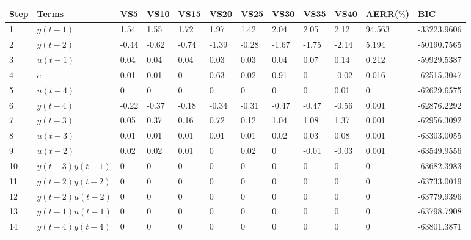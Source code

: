 \begin{tabular}{llllllllllll}
Step & Terms & VS5 & VS10 & VS15 & VS20 & VS25 & VS30 & VS35 & VS40 & AERR($\%$) & BIC \\ 
\hline 
1 & $y(t-1)$ & 1.54 & 1.55 & 1.72 & 1.97 & 1.42 & 2.04 & 2.05 & 2.12 & 94.563 & -33223.9606 \\ 
2 & $y(t-2)$ & -0.44 & -0.62 & -0.74 & -1.39 & -0.28 & -1.67 & -1.75 & -2.14 & 5.194 & -50190.7565 \\ 
3 & $u(t-1)$ & 0.04 & 0.04 & 0.04 & 0.03 & 0.03 & 0.04 & 0.07 & 0.14 & 0.212 & -59929.5387 \\ 
4 & $c$ & 0.01 & 0.01 & 0 & 0.63 & 0.02 & 0.91 & 0 & -0.02 & 0.016 & -62515.3047 \\ 
5 & $u(t-4)$ & 0 & 0 & 0 & 0 & 0 & 0 & 0 & 0.01 & 0 & -62629.6575 \\ 
6 & $y(t-4)$ & -0.22 & -0.37 & -0.18 & -0.34 & -0.31 & -0.47 & -0.47 & -0.56 & 0.001 & -62876.2292 \\ 
7 & $y(t-3)$ & 0.05 & 0.37 & 0.16 & 0.72 & 0.12 & 1.04 & 1.08 & 1.37 & 0.001 & -62956.3092 \\ 
8 & $u(t-3)$ & 0.01 & 0.01 & 0.01 & 0.01 & 0.01 & 0.02 & 0.03 & 0.08 & 0.001 & -63303.0055 \\ 
9 & $u(t-2)$ & 0.02 & 0.02 & 0.01 & 0 & 0.02 & 0 & -0.01 & -0.03 & 0.001 & -63549.9556 \\ 
10 & $y(t-3)y(t-1)$ & 0 & 0 & 0 & 0 & 0 & 0 & 0 & 0 & 0 & -63682.3983 \\ 
11 & $y(t-2)y(t-2)$ & 0 & 0 & 0 & 0 & 0 & 0 & 0 & 0 & 0 & -63733.0019 \\ 
12 & $y(t-2)u(t-2)$ & 0 & 0 & 0 & 0 & 0 & 0 & 0 & 0 & 0 & -63779.9396 \\ 
13 & $y(t-1)u(t-1)$ & 0 & 0 & 0 & 0 & 0 & 0 & 0 & 0 & 0 & -63798.7908 \\ 
14 & $y(t-4)y(t-4)$ & 0 & 0 & 0 & 0 & 0 & 0 & 0 & 0 & 0 & -63801.3871 \\ 
\hline 
\end{tabular}